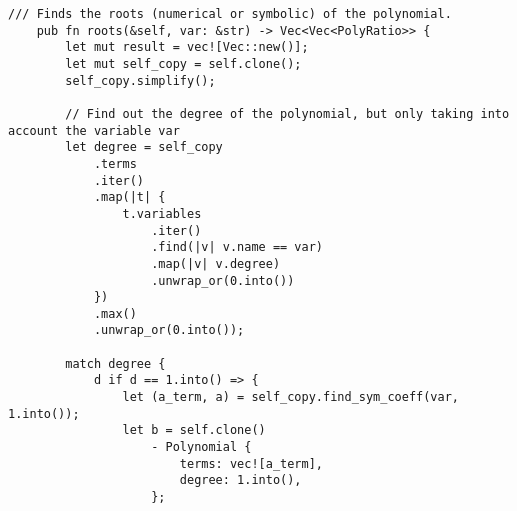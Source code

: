 \begin{lstlisting}[caption={The implementation of the \texttt{roots()} method for the \texttt{Polynomial} struct}, label={lst:polynomial-roots}]
    /// Finds the roots (numerical or symbolic) of the polynomial.
    pub fn roots(&self, var: &str) -> Vec<Vec<PolyRatio>> {
        let mut result = vec![Vec::new()];
        let mut self_copy = self.clone();
        self_copy.simplify();

        // Find out the degree of the polynomial, but only taking into account the variable var
        let degree = self_copy
            .terms
            .iter()
            .map(|t| {
                t.variables
                    .iter()
                    .find(|v| v.name == var)
                    .map(|v| v.degree)
                    .unwrap_or(0.into())
            })
            .max()
            .unwrap_or(0.into());

        match degree {
            d if d == 1.into() => {
                let (a_term, a) = self_copy.find_sym_coeff(var, 1.into());
                let b = self.clone()
                    - Polynomial {
                        terms: vec![a_term],
                        degree: 1.into(),
                    };


\end{lstlisting}
